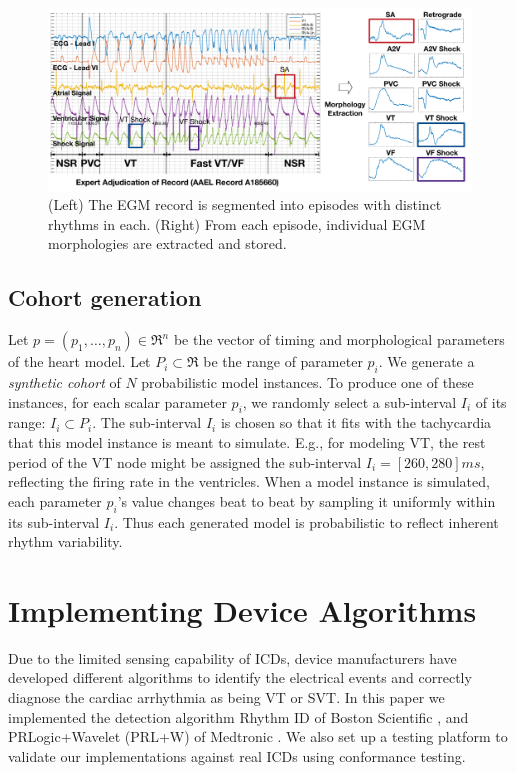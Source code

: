 \begin{figure}[t]
	\centering
	\includegraphics[scale=0.35]{figures/figadjudication.pdf}
	\caption{\small  (Left) The EGM record is segmented into episodes with distinct rhythms in each. (Right) From each episode, individual EGM morphologies are extracted and stored.
	}
	\label{fig:adjudication}
\end{figure}

\subsection{Cohort generation}
\label{sec:cohort generation}
Let $p = (p_1,\ldots,p_n) \in \Re^n$ be the vector of timing and morphological parameters of the heart model.
Let $P_i \subset \Re$ be the range of parameter $p_i$.
We generate a \emph{synthetic cohort} of $N$ probabilistic model instances.
To produce one of these instances, for each scalar parameter $p_i$, we randomly select a sub-interval $I_i$ of its range: $I_i \subset P_i$.
The sub-interval $I_i$ is chosen so that it fits with the tachycardia that this model instance is meant to simulate.
E.g., for modeling VT, the rest period of the VT node might be assigned the sub-interval $I_i = [260, 280]ms$, reflecting the firing rate in the ventricles.
When a model instance is simulated, each parameter $p_i$'s value changes beat to beat by sampling it uniformly within its sub-interval $I_i$.
Thus each generated model is probabilistic to reflect inherent rhythm variability.

\section{Implementing Device Algorithms} 
\label{sec:device models}
Due to the limited sensing capability of ICDs, device manufacturers have developed different algorithms to identify the electrical events and correctly diagnose the cardiac arrhythmia as being VT or SVT.
In this paper we implemented the detection algorithm Rhythm ID of Boston Scientific \cite{compass,Ellenbogen11_Pacingbook},%
and PRLogic+Wavelet (PRL+W) of Medtronic \cite{Singer,Wavelet}.
We also set up a testing platform to validate our implementations against real ICDs using conformance testing.
